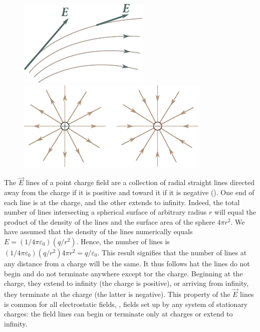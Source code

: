 \begin{figure}[t]
	\begin{minipage}[t]{0.5\linewidth}
		\begin{center}
			\includegraphics[scale=1]{figures/ch_01/fig_1_5.pdf}
			\caption[]{}
			\label{fig:1_5}
		\end{center}
	\end{minipage}
	\hspace{-0.05cm}
	\begin{minipage}[t]{0.5\linewidth}
		\begin{center}
			\includegraphics[scale=1]{figures/ch_01/fig_1_6.pdf}
			\caption[]{}
			\label{fig:1_6}
		\end{center}
	\end{minipage}
\vspace{-0.4cm}
\end{figure}

The $\vec{E}$ lines of a point charge field are a collection of radial straight lines directed away from the charge if it is positive and toward it if it is negative (). One end of each line is at the charge, and the other extends to infinity. Indeed, the total number of lines intersecting a spherical surface of arbitrary radius $r$ will equal the product of the density of the lines and the surface area of the sphere $4\pi r^2$. We have assumed that the density of the lines numerically equals $E=(1/4\pi\varepsilon_0)(q/r^2)$. Hence, the number of lines is $(1/4\pi\varepsilon_0)(q/r^2) 4\pi r^2=q/\varepsilon_0$. This result signifies that the number of lines at any distance from a charge will be the same. It thus follows hat the lines do not begin and do not terminate anywhere except tor the charge. Beginning at the charge, they extend to infinity (the charge is positive), or arriving from infinity, they terminate at the charge (the latter is negative). This property of the $\vec{E}$ lines is common for all electrostatic fields, \ie, fields set up by any system of stationary charges: the field lines can begin or terminate only at charges or extend to infinity.

